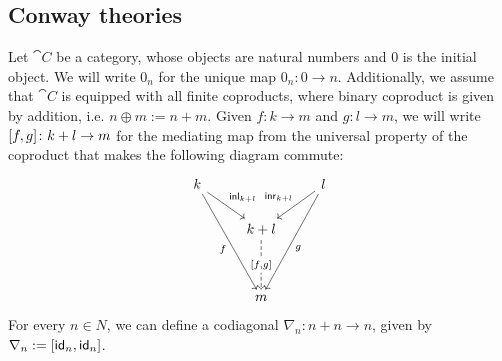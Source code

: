 \subsection{Conway theories}\label{c3:subsec:conway}
Let $\cat{C}$ be a category, whose objects are natural numbers and $0$ is the initial object. We will write $0_n$ for the unique map $0_n \colon 0 \to n$. Additionally, we assume that $\cat{C}$ is equipped with all finite coproducts, where binary coproduct is given by addition, i.e. $n \oplus m := n + m$. Given $f \colon k \to m$ and $g \colon l \to m$, we will write $[ f,g ] \colon k +l \to m$ for the mediating map from the universal property of the coproduct that makes the following diagram commute:
\begin{equation}\label{eqn:mediating}
\begin{tikzcd}
	k && l \\
	& {k+l} \\
	\\
	& m
	\arrow["\inl_{k + l}", from=1-1, to=2-2]
	\arrow["f"', from=1-1, to=4-2]
	\arrow["\inr_{k + l}"', from=1-3, to=2-2]
	\arrow["g", from=1-3, to=4-2]
	\arrow["{\lc f , g \rc}"{description}, dashed, from=2-2, to=4-2]
\end{tikzcd}
\end{equation}
For every $n \in N$, we can define a codiagonal $\nabla_{n} \colon n + n \to n$, given by $\nabla_n := [\mathsf{id}_n,\mathsf{id}_n]$.

